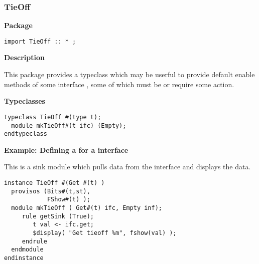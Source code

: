 \subsubsection{TieOff}
\label{lib-tieoff}

{\bf Package}


\begin{verbatim}
import TieOff :: * ;
\end{verbatim}



{\bf Description}

This package provides a typeclass  which may be
userful to provide default
enable methods of some interface , some of which must be
 or require some action.


{\bf Typeclasses}

\begin{verbatim}
typeclass TieOff #(type t);
  module mkTieOff#(t ifc) (Empty);
endtypeclass
\end{verbatim}


{\bf Example: Defining a  for a  interface}

This is a  sink module which pulls data from the 
interface and displays the data.

\begin{verbatim}
instance TieOff #(Get #(t) )
  provisos (Bits#(t,st),
            FShow#(t) );
  module mkTieOff ( Get#(t) ifc, Empty inf);
     rule getSink (True);
        t val <- ifc.get;
        $display( "Get tieoff %m", fshow(val) );
     endrule
  endmodule
endinstance
\end{verbatim}
